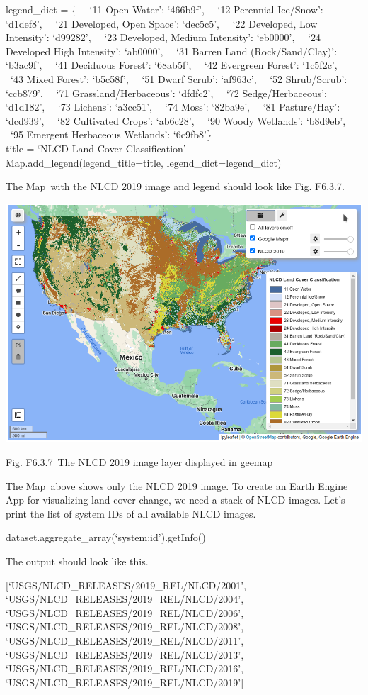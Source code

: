 \documentclass[
  letterpaper,
  DIV=11,
  numbers=noendperiod]{scrreprt}
\begin{document}
legend\_dict = \{~ ~`11 Open Water': `466b9f',~ ~`12 Perennial
Ice/Snow': `d1def8',~ ~`21 Developed, Open Space': `dec5c5',~ ~`22
Developed, Low Intensity': `d99282',~ ~`23 Developed, Medium Intensity':
`eb0000',~ ~`24 Developed High Intensity': `ab0000',~ ~`31 Barren Land
(Rock/Sand/Clay)': `b3ac9f',~ ~`41 Deciduous Forest': `68ab5f',~ ~`42
Evergreen Forest': `1c5f2c',~ ~`43 Mixed Forest': `b5c58f',~ ~`51 Dwarf
Scrub': `af963c',~ ~`52 Shrub/Scrub': `ccb879',~ ~`71
Grassland/Herbaceous': `dfdfc2',~ ~`72 Sedge/Herbaceous': `d1d182',~
~`73 Lichens': `a3cc51',~ ~`74 Moss': `82ba9e',~ ~`81 Pasture/Hay':
`dcd939',~ ~`82 Cultivated Crops': `ab6c28',~ ~`90 Woody Wetlands':
`b8d9eb',~ ~`95 Emergent Herbaceous Wetlands': `6c9fb8'\}\\
title = `NLCD Land Cover Classification'\\
Map.add\_legend(legend\_title=title, legend\_dict=legend\_dict)

The Map~with the NLCD 2019 image and legend should look like Fig.
F6.3.7.

\includegraphics{./F6/image60.png}

Fig. F6.3.7~The NLCD 2019 image layer displayed in geemap

The Map~above shows only the NLCD 2019 image. To create an Earth Engine
App for visualizing land cover change, we need a stack of NLCD images.
Let's print the list of system IDs of all available NLCD images.

dataset.aggregate\_array(`system:id').getInfo()

The output should look like this.

{[}`USGS/NLCD\_RELEASES/2019\_REL/NLCD/2001',\\
`USGS/NLCD\_RELEASES/2019\_REL/NLCD/2004',\\
`USGS/NLCD\_RELEASES/2019\_REL/NLCD/2006',\\
`USGS/NLCD\_RELEASES/2019\_REL/NLCD/2008',\\
`USGS/NLCD\_RELEASES/2019\_REL/NLCD/2011',\\
`USGS/NLCD\_RELEASES/2019\_REL/NLCD/2013',\\
`USGS/NLCD\_RELEASES/2019\_REL/NLCD/2016',\\
`USGS/NLCD\_RELEASES/2019\_REL/NLCD/2019'{]}
\end{document}
